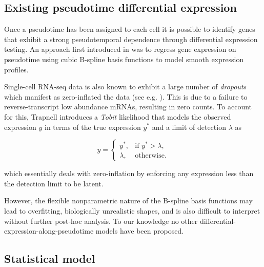 \subsection{Existing pseudotime differential expression}

Once a pseudotime has been assigned to each cell it is possible to identify genes that exhibit a strong pseudotemporal dependence through differential expression testing. An approach first introduced in \cite{Trapnell2014-xi} was to regress gene expression on pseudotime using cubic B-spline basis functions to model smooth expression profiles.

Single-cell RNA-seq data is also known to exhibit a large number of \emph{dropouts} which manifest as zero-inflated the data (see e.g. \cite{Kharchenko2014}). This is due to a failure to reverse-transcript low abundance mRNAs, resulting in zero counts. To account for this, Trapnell introduces a \emph{Tobit} likelihood that models the observed expression $y$ in terms of the true expression $y^*$ and a limit of detection $\lambda$ %
as

\begin{equation}
	y =
	\begin{cases}
	    y^*, & \text{if $y^* > \lambda$},  \\
	    \lambda, &  \text{otherwise}.
	\end{cases}
\end{equation}

which essentially deals with zero-inflation by enforcing any expression less than the detection limit to be latent.

However, the flexible nonparametric nature of the B-spline basis functions may lead to overfitting, biologically unrealistic shapes, and is also difficult to interpret without further post-hoc analysis. To our knowledge no other differential-expression-along-pseudotime models have been proposed.


\subsection{Statistical model}

